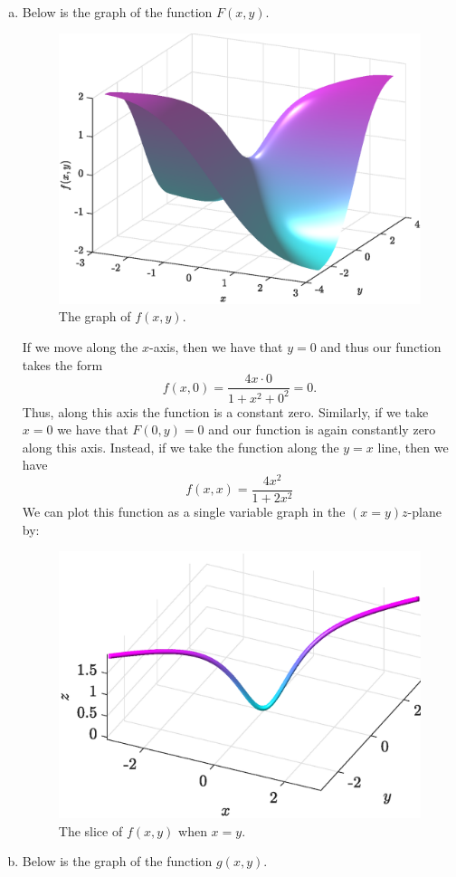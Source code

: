 \documentclass[12pt]{article} %
\begin{document}
\begin{solution}~
\begin{enumerate}[(a)]
    \item Below is the graph of the function $F(x,y)$.
    \begin{figure}[H]
        \centering
        \includegraphics[width=.65\textwidth]{figures/3a}
        \caption{The graph of $f(x,y)$.}
    \end{figure}
    If we move along the $x$-axis, then we have that $y=0$ and thus our function takes the form
    \[
    f(x,0) = \frac{4x\cdot 0}{1+x^2+0^2} = 0.
    \]
    Thus, along this axis the function is a constant zero. Similarly, if we take $x=0$ we have that $F(0,y)=0$ and our function is again constantly zero along this axis. Instead, if we take the function along the $y=x$ line, then we have
    \[
    f(x,x) = \frac{4x^2}{1+2x^2}
    \]
    We can plot this function as a single variable graph in the $(x=y)z$-plane by:
    \begin{figure}[H]
    	\centering
    	\includegraphics[width=.6\textwidth]{figures/3a_x=y}
    	\caption{The slice of $f(x,y)$ when $x=y$.}
    \end{figure}
    \item Below is the graph of the function $g(x,y)$.
    \begin{figure}[H]
        \centering

\end{figure}
\end{enumerate}
\end{solution}
\end{document}
